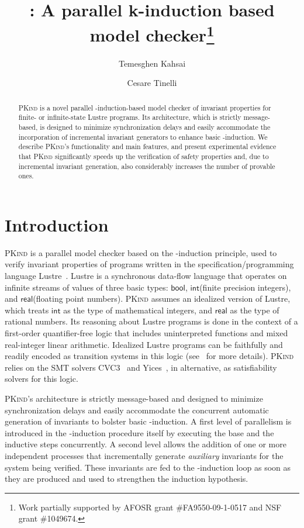 \documentclass[submission,copyright,creativecommons]{eptcs}
\title{\PKind: A parallel k-induction based model checker\thanks{Work partially supported by AFOSR grant \#FA9550-09-1-0517 and NSF grant \#1049674.}}
\author{Temesghen Kahsai
\institute{The University of Iowa}
\email{temesghen-kahsaiazene@uiowa.edu}
\and
Cesare Tinelli
\institute{The University of Iowa}
\email{cesare-tinelli@uiowa.edu}
}
\newcommand{\PKind}{\textrm{\textsc{PKind}}\xspace}
\newcommand{\bool}{\ensuremath{\mathsf{bool}}\xspace}
\newcommand{\inte}{\ensuremath{\mathsf{int}}\xspace}
\newcommand{\real}{\ensuremath{\mathsf{real}}\xspace}
\begin{document}
\maketitle

\begin{abstract}
  \PKind is a novel parallel -induction-based model checker 
of invariant properties
for finite- or infinite-state Lustre programs. Its architecture, which is
  strictly message-based, is designed to minimize synchronization
  delays and easily accommodate the incorporation of incremental
  invariant generators to enhance basic -induction. 
We describe \PKind's functionality and main features, and
  present experimental evidence that \PKind significantly speeds up
  the verification of safety properties and, due to incremental
  invariant generation, also considerably increases the number of
  provable ones.
\end{abstract}

\section{Introduction}

\PKind is a parallel model checker based on the
-induction principle, used to verify invariant
 properties of
programs written in the specification/programming language
Lustre~\cite{lustre}. Lustre is a synchronous data-flow language
that operates on infinite streams of values of three basic types: \bool,
\inte (finite precision integers), and \real (floating point numbers).
\PKind assumes an idealized version of Lustre, which treats \inte as the
type of mathematical integers, and \real as the type of rational
numbers.  
Its reasoning about Lustre programs is done in the context of 
a first-order quantifier-free logic 
that includes uninterpreted functions and mixed real-integer linear arithmetic. 
Idealized Lustre programs can be faithfully and readily encoded 
as transition systems in this logic  (see~\cite{hagen08} for more
details).  
\PKind relies on the SMT solvers CVC3~\cite{BarTin-CAV-07} and
Yices~\cite{DutDeM-RR-06}, in alternative, 
as satisfiability solvers for this logic.

\PKind's architecture is strictly message-based and designed to minimize synchronization delays and easily accommodate the
concurrent automatic generation of invariants to bolster basic
-induction. A first level of parallelism is introduced in the
-induction procedure itself by executing the base and the inductive
steps concurrently. A second level allows the addition
of one or more independent processes that incrementally generate
\emph{auxiliary} invariants for the system being verified. These invariants are fed to
the -induction loop as soon as they are produced and used to
strengthen the induction hypothesis. 
\end{document}
